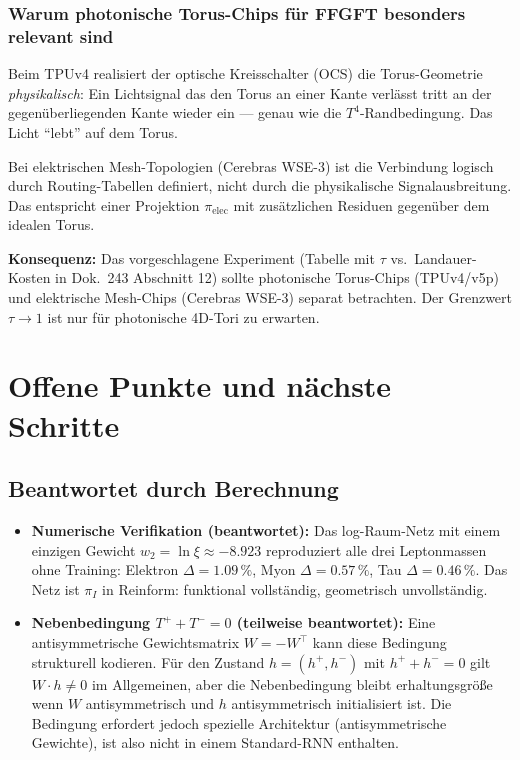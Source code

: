 \subsubsection*{Warum photonische Torus-Chips für FFGFT besonders relevant sind}

Beim TPUv4 realisiert der optische Kreisschalter (OCS) die Torus-Geometrie
\emph{physikalisch}: Ein Lichtsignal das den Torus an einer Kante verlässt
tritt an der gegenüberliegenden Kante wieder ein --- genau wie die
$T^4$-Randbedingung. Das Licht ``lebt'' auf dem Torus.

Bei elektrischen Mesh-Topologien (Cerebras WSE-3) ist die Verbindung
logisch durch Routing-Tabellen definiert, nicht durch die physikalische
Signalausbreitung. Das entspricht einer Projektion $\pi_\text{elec}$
mit zusätzlichen Residuen gegenüber dem idealen Torus.

\textbf{Konsequenz:} Das vorgeschlagene Experiment (Tabelle mit $\tau$
vs.\ Landauer-Kosten in Dok.~243 Abschnitt 12) sollte photonische
Torus-Chips (TPUv4/v5p) und elektrische Mesh-Chips (Cerebras WSE-3)
separat betrachten. Der Grenzwert $\tau \to 1$ ist nur für photonische
4D-Tori zu erwarten.


\section{Offene Punkte und nächste Schritte}

\subsection*{Beantwortet durch Berechnung}

\begin{itemize}
  \item \textbf{Numerische Verifikation (beantwortet):}
        Das log-Raum-Netz mit einem einzigen Gewicht $w_2 = \ln\xi \approx -8.923$
        reproduziert alle drei Leptonmassen ohne Training:
        Elektron $\Delta=1.09\,\%$, Myon $\Delta=0.57\,\%$, Tau $\Delta=0.46\,\%$.
        Das Netz ist $\pi_I$ in Reinform: funktional vollständig, geometrisch unvollständig.

  \item \textbf{Nebenbedingung $T^+ + T^- = 0$ (teilweise beantwortet):}
        Eine antisymmetrische Gewichtsmatrix $W = -W^\top$ kann diese Bedingung
        strukturell kodieren. Für den Zustand $h = (h^+, h^-)$ mit $h^+ + h^- = 0$
        gilt $W \cdot h \neq 0$ im Allgemeinen, aber die Nebenbedingung bleibt
        erhaltungsgröße wenn $W$ antisymmetrisch und $h$ antisymmetrisch initialisiert
        ist. Die Bedingung erfordert jedoch spezielle Architektur (antisymmetrische
        Gewichte), ist also nicht in einem Standard-RNN enthalten.
\end{itemize}

